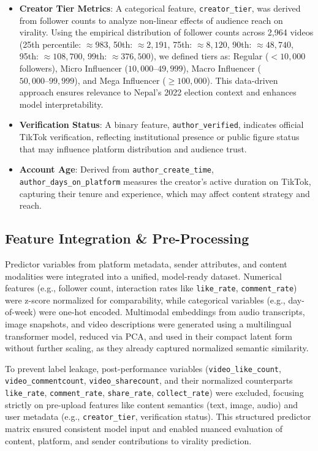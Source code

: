 \documentclass[12pt,a4paper]{report}
\begin{document}
\begin{itemize}
    \item \textbf{Creator Tier Metrics}: A categorical feature, \texttt{creator\_tier}, was derived from follower counts to analyze non-linear effects of audience reach on virality. Using the empirical distribution of follower counts across 2,964 videos (25th percentile: $\approx 983$, 50th: $\approx 2,191$, 75th: $\approx 8,120$, 90th: $\approx 48,740$, 95th: $\approx 108,700$, 99th: $\approx 376,500$), we defined tiers as: Regular ($< 10,000$ followers), Micro Influencer ($10,000–49,999$), Macro Influencer ($50,000–99,999$), and Mega Influencer ($\geq 100,000$). This data-driven approach ensures relevance to Nepal’s 2022 election context and enhances model interpretability.
\newpage
    \item \textbf{Verification Status}: A binary feature, \texttt{author\_verified}, indicates official TikTok verification, reflecting institutional presence or public figure status that may influence platform distribution and audience trust.
    
    \item \textbf{Account Age}: Derived from \texttt{author\_create\_time}, \texttt{author\_days\_on\_platform} measures the creator’s active duration on TikTok, capturing their tenure and experience, which may affect content strategy and reach.
\end{itemize}
\subsection{Feature Integration \& Pre-Processing}

Predictor variables from platform metadata, sender attributes, and content modalities were integrated into a unified, model-ready dataset. Numerical features (e.g., follower count, interaction rates like \texttt{like\_rate}, \texttt{comment\_rate}) were z-score normalized for comparability, while categorical variables (e.g., day-of-week) were one-hot encoded. Multimodal embeddings from audio transcripts, image snapshots, and video descriptions were generated using a multilingual transformer model, reduced via PCA, and used in their compact latent form without further scaling, as they already captured normalized semantic similarity.

To prevent label leakage, post-performance variables (\texttt{video\_like\_count}, \texttt{video\_commentcount}, \texttt{video\_sharecount}, and their normalized counterparts \texttt{like\_rate}, \texttt{comment\_rate}, \texttt{share\_rate}, \texttt{collect\_rate}) were excluded, focusing strictly on pre-upload features like content semantics (text, image, audio) and user metadata (e.g., \texttt{creator\_tier}, verification status). This structured predictor matrix ensured consistent model input and enabled nuanced evaluation of content, platform, and sender contributions to virality prediction.
\newpage
\end{document}
